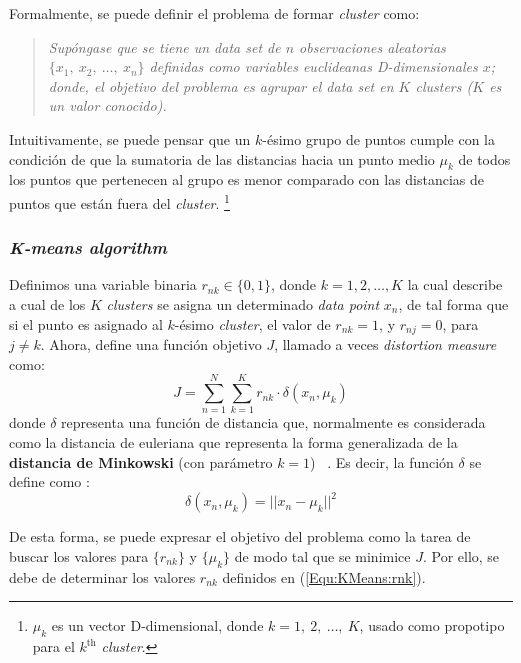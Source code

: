 Formalmente, se puede definir el problema de formar \textit{cluster} como:
\begin{quotation}
\small
\textsl{
Supóngase que se tiene un \textit{data set} de $n$ observaciones aleatorias
$\lbrace x_1,~ x_2,~ \dots,~ x_n \rbrace$ definidas como variables euclideanas
D-dimensionales $x$; donde, el objetivo del problema es agrupar el 
\textit{data set} en $K$ \textit{clusters} ($K$ es un valor conocido).}
\end{quotation}

Intuitivamente, se puede pensar que un $k$-ésimo grupo de puntos cumple con la
condición de que la sumatoria de las distancias hacia un punto medio $\mu_k$ 
de todos los puntos que pertenecen al grupo es menor comparado con las 
distancias de puntos que están fuera del \textit{cluster}. \footnote{$\mu_k$ 
es un vector D-dimensional, donde $k=1,~ 2,~ \dots,~ K$, usado como propotipo
para el $k^\text{th}$ \textit{cluster}.}

\subsubsection{\textit{K-means algorithm}}
Definimos una variable binaria $r_{nk} \in \lbrace 0,1 \rbrace $, donde
$k=1,2,\dots, K$ la cual describe a cual de los $K$ \textit{clusters} se
asigna un determinado \textit{data point} $x_n$, de tal forma que si el punto
es asignado al $k$-ésimo \textit{cluster}, el valor de $r_{nk} = 1$, y 
$r_{nj} = 0$, para $j \neq k$. Ahora, define una función objetivo $J$, llamado 
a veces \textit{distortion measure} como:
\begin{equation}
  J = \sum_{n=1}^N{\sum_{k=1}^K{r_{nk} \cdot \delta (x_n, \mu_{k})}}
  \label{Equ:J_kmeans}
\end{equation}
donde $\delta$ representa una función de distancia que, normalmente es
considerada como la distancia de euleriana que representa la forma 
generalizada de la \textbf{distancia de Minkowski} (con parámetro $k=1$)~
\cite[pág. 353]{Webb:2003:SPR}. %
Es decir, la función $\delta$ se define como :
\begin{equation}
  \delta (x_n, \mu_k) = ||x_n - \mu_k||^2
\end{equation}

De esta forma, se puede expresar el objetivo del problema como la tarea de
buscar los valores para $\lbrace r_{nk} \rbrace$ y $\lbrace \mu_k \rbrace$ de
modo tal que se minimice $J$. Por ello, se debe de determinar los valores
$r_{nk}$ definidos en (\ref{Equ:KMeans:rnk}).

